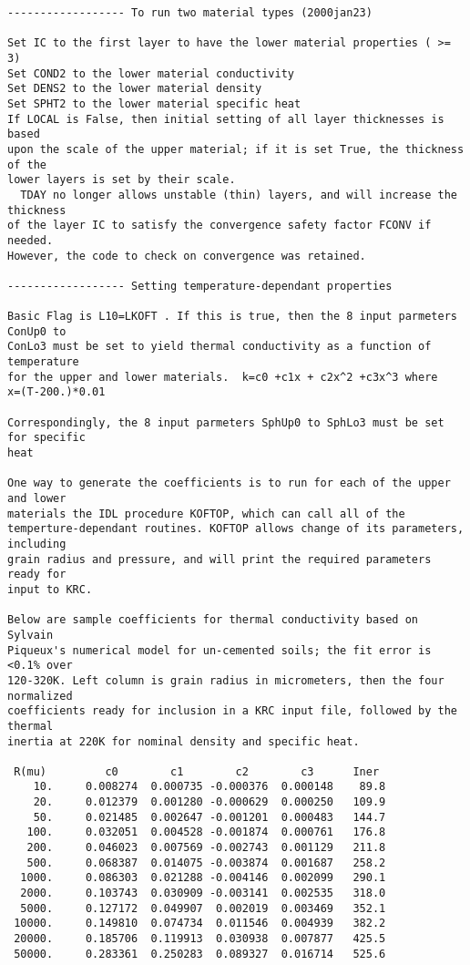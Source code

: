 \begin{verbatim}
------------------ To run two material types (2000jan23)

Set IC to the first layer to have the lower material properties ( >= 3)
Set COND2 to the lower material conductivity
Set DENS2 to the lower material density
Set SPHT2 to the lower material specific heat
If LOCAL is False, then initial setting of all layer thicknesses is based
upon the scale of the upper material; if it is set True, the thickness of the
lower layers is set by their scale.
  TDAY no longer allows unstable (thin) layers, and will increase the thickness
of the layer IC to satisfy the convergence safety factor FCONV if needed. 
However, the code to check on convergence was retained.

------------------ Setting temperature-dependant properties

Basic Flag is L10=LKOFT . If this is true, then the 8 input parmeters ConUp0 to
ConLo3 must be set to yield thermal conductivity as a function of temperature
for the upper and lower materials.  k=c0 +c1x + c2x^2 +c3x^3 where
x=(T-200.)*0.01 

Correspondingly, the 8 input parmeters SphUp0 to SphLo3 must be set for specific
heat
 
One way to generate the coefficients is to run for each of the upper and lower
materials the IDL procedure KOFTOP, which can call all of the
temperture-dependant routines. KOFTOP allows change of its parameters, including
grain radius and pressure, and will print the required parameters ready for
input to KRC.

Below are sample coefficients for thermal conductivity based on Sylvain
Piqueux's numerical model for un-cemented soils; the fit error is <0.1% over
120-320K. Left column is grain radius in micrometers, then the four normalized
coefficients ready for inclusion in a KRC input file, followed by the thermal
inertia at 220K for nominal density and specific heat.

 R(mu)         c0        c1        c2        c3      Iner  
    10.     0.008274  0.000735 -0.000376  0.000148    89.8 
    20.     0.012379  0.001280 -0.000629  0.000250   109.9 
    50.     0.021485  0.002647 -0.001201  0.000483   144.7 
   100.     0.032051  0.004528 -0.001874  0.000761   176.8 
   200.     0.046023  0.007569 -0.002743  0.001129   211.8 
   500.     0.068387  0.014075 -0.003874  0.001687   258.2 
  1000.     0.086303  0.021288 -0.004146  0.002099   290.1 
  2000.     0.103743  0.030909 -0.003141  0.002535   318.0 
  5000.     0.127172  0.049907  0.002019  0.003469   352.1 
 10000.     0.149810  0.074734  0.011546  0.004939   382.2 
 20000.     0.185706  0.119913  0.030938  0.007877   425.5 
 50000.     0.283361  0.250283  0.089327  0.016714   525.6 




\end{verbatim}
